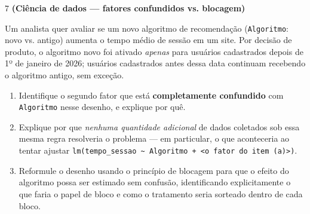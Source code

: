 \documentclass[11pt]{article}
\begin{document}
\begin{questao}{7} \textbf{(Ciência de dados --- fatores confundidos vs. blocagem)}

Um analista quer avaliar se um novo algoritmo de recomendação (\texttt{Algoritmo}: novo vs. antigo)
aumenta o tempo médio de sessão em um site. Por decisão de produto, o algoritmo novo foi ativado
\emph{apenas} para usuários cadastrados depois de 1º de janeiro de 2026; usuários cadastrados antes
dessa data continuam recebendo o algoritmo antigo, sem exceção.

\begin{enumerate}[label=(\alph*)]
  \item Identifique o segundo fator que está \textbf{completamente confundido} com
    \texttt{Algoritmo} nesse desenho, e explique por quê.
  \item Explique por que \emph{nenhuma quantidade adicional} de dados coletados sob essa mesma
    regra resolveria o problema — em particular, o que aconteceria ao tentar ajustar
    \texttt{lm(tempo\_sessao \textasciitilde{} Algoritmo + <o fator do item (a)>)}.
  \item Reformule o desenho usando o princípio de blocagem para que o efeito do algoritmo possa
    ser estimado sem confusão, identificando explicitamente o que faria o papel de bloco e como o
    tratamento seria sorteado dentro de cada bloco.
\end{enumerate}
\end{questao}
\end{document}
